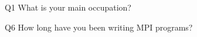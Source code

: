 \begin{description}%
\item{Q1} What is your main occupation?%
\item{Q6} How long have you been writing MPI programs?%
\end{description}%
